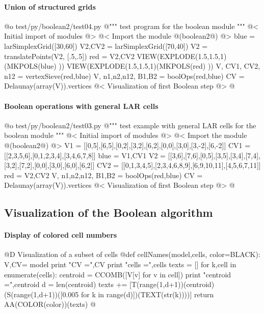 \documentclass[11pt,oneside]{article}	%
\begin{document}
\paragraph{Union of structured grids}

@o test/py/boolean2/test04.py
@{""" test program for the boolean module """
@< Initial import of modules @>
@< Import the module @(boolean2@) @>
blue = larSimplexGrid([30,60])
V2,CV2 = larSimplexGrid([70,40])
V2 = translatePoints(V2, [.5,.5])
red = V2,CV2
VIEW(EXPLODE(1.5,1.5,1)(MKPOLS(blue) ))
VIEW(EXPLODE(1.5,1.5,1)(MKPOLS(red) ))
V, CV1, CV2, n12 = vertexSieve(red,blue)
V, n1,n2,n12, B1,B2 = boolOps(red,blue)
CV = Delaunay(array(V)).vertices
@< Visualization of first Boolean step @>
@}

\paragraph{Boolean operations with general LAR cells}

@o test/py/boolean2/test03.py
@{""" test example with general LAR cells for the boolean module """
@< Initial import of modules @>
@< Import the module @(boolean2@) @>
V1 = [[0,5],[6,5],[0,2],[3,2],[6,2],[0,0],[3,0],[3,-2],[6,-2]]
CV1 = [[2,3,5,6],[0,1,2,3,4],[3,4,6,7,8]]
blue = V1,CV1
V2 = [[3,6],[7,6],[0,5],[3,5],[3,4],[7,4],[3,2],[7,2],[0,0],[3,0],[6,0],[6,2]]
CV2 = [[0,1,3,4,5],[2,3,4,6,8,9],[6,9,10,11],[4,5,6,7,11]]
red = V2,CV2
V, n1,n2,n12, B1,B2 = boolOps(red,blue)
CV = Delaunay(array(V)).vertices
@< Visualization of first Boolean step @>
@}

\subsection{Visualization of the Boolean algorithm}

\paragraph{Display of colored cell numbers}

@D Visualization of a subset of cells
@{def cellNames(model,cells, color=BLACK):
	V,CV= model
	print "\n CV =",CV
	print "\n cells =",cells
	texts = []
	for k,cell in enumerate(cells):
		centroid = CCOMB([V[v] for v in cell])
		print "centroid =",centroid
		d = len(centroid)
		texts += [T(range(1,d+1))(centroid)(S(range(1,d+1))([0.005 for k in range(d)])(TEXT(str(k))))]
	return AA(COLOR(color))(texts)
@}
\end{document}
